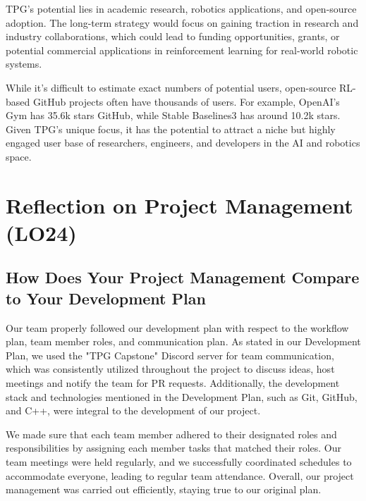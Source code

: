 \documentclass{article}
\begin{document}
TPG's potential lies in academic research, robotics applications, and open-source adoption. The long-term strategy 
would focus on gaining traction in research and industry collaborations, which could lead to funding opportunities, 
grants, or potential commercial applications in reinforcement learning for real-world robotic systems.

While it's difficult to estimate exact numbers of potential users, open-source RL-based GitHub projects often have
thousands of users. For example, OpenAI's Gym has 35.6k stars GitHub, while Stable Baselines3 has around 10.2k stars. Given 
TPG's unique focus, it has the potential to attract a niche but highly engaged user base of researchers, engineers, 
and developers in the AI and robotics space.

\section{Reflection on Project Management (LO24)}


\subsection{How Does Your Project Management Compare to Your Development Plan}


Our team properly followed our development plan with respect to the workflow plan, team member roles, and communication plan. As stated in our Development Plan, we used the "TPG Capstone" Discord server for team communication, which was consistently utilized throughout the project to discuss ideas, host meetings and notify the team for PR requests. Additionally, the development stack and technologies mentioned in the Development Plan, such as Git, GitHub, and C++, were integral to the development of our project.

We made sure that each team member adhered to their designated roles and responsibilities by assigning each member tasks that matched their roles. Our team meetings were held regularly, and we successfully coordinated schedules to accommodate everyone, leading to regular team attendance. Overall, our project management was carried out efficiently, staying true to our original plan.
\end{document}
